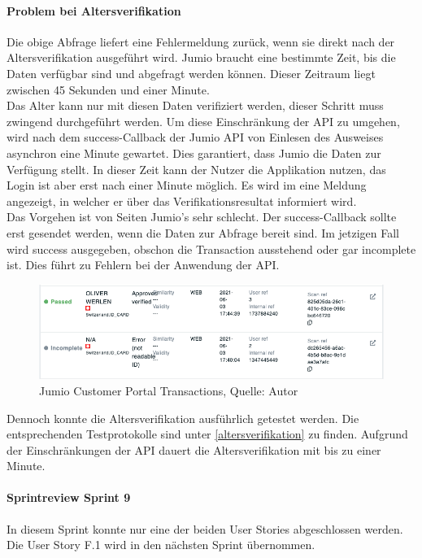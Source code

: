 \paragraph{Problem bei Altersverifikation}
Die obige Abfrage liefert eine Fehlermeldung zurück, wenn sie direkt nach der Altersverifikation ausgeführt wird. Jumio braucht eine bestimmte Zeit, bis die Daten verfügbar sind und abgefragt werden können. Dieser Zeitraum liegt zwischen 45 Sekunden und einer Minute. \\
Das Alter kann nur mit diesen Daten verifiziert werden, dieser Schritt muss zwingend durchgeführt werden. Um diese Einschränkung der API zu umgehen, wird nach dem success-Callback der Jumio API von Einlesen des Ausweises asynchron eine Minute gewartet. Dies garantiert, dass Jumio die Daten zur Verfügung stellt. In dieser Zeit kann der Nutzer die Applikation nutzen, das Login ist aber erst nach einer Minute möglich. Es wird im eine Meldung angezeigt, in welcher er über das Verifikationsresultat informiert wird. \\
\newpage
Das Vorgehen ist von Seiten Jumio's sehr schlecht. Der success-Callback sollte erst gesendet werden, wenn die Daten zur Abfrage bereit sind. Im jetzigen Fall wird success ausgegeben, obschon die Transaction ausstehend oder gar incomplete ist. Dies führt zu Fehlern bei der Anwendung der API. 
 \begin{figure}[H]
	\centering
	\includegraphics[width=1\textwidth]{images/jumioIncomplete.PNG}
	\caption[Jumio Customer Portal Transactions]{Jumio Customer Portal Transactions, Quelle: Autor}
	\label{img: jumioIncomplete}
\end{figure} 

Dennoch konnte die Altersverifikation ausführlich getestet werden. Die entsprechenden Testprotokolle sind unter \ref{altersverifikation} zu finden. Aufgrund der Einschränkungen der API dauert die Altersverifikation mit bis zu einer Minute. 

\paragraph{Sprintreview Sprint 9}
In diesem Sprint konnte nur eine der beiden User Stories abgeschlossen werden. Die \gls{User Story} F.1 wird in den nächsten Sprint übernommen. 
\newpage
